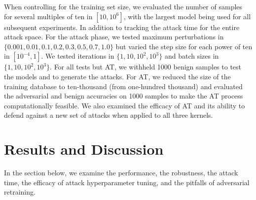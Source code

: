 \documentclass[fonts]{icst}
\begin{document}
When controlling for the training set size, we evaluated the number of samples for several multiples of ten in $[10, 10^6]$, with the largest model being used for all subsequent experiments.
In addition to tracking the attack time for the entire attack space.
For the attack phase, we tested maximum perturbations in $\{0.001, 0.01, 0.1, 0.2, 0.3, 0.5, 0.7, 1.0\}$  but varied the step size for each power of ten in $[10^{-4}, 1]$.
We tested iterations in $\{1, 10, 10^2, 10^3\}$ and batch sizes in $\{1, 10, 10^2, 10^3\}$.
For all tests but AT, we withheld 1000 benign samples to test the models and to generate the attacks.
For AT, we reduced the size of the training database to ten-thousand (from one-hundred thousand) and evaluated the adversarial and benign accuracies on 1000 samples to make the AT process computationally feasible.
We also examined the efficacy of AT and its ability to defend against a new set of attacks when applied to all three kernels.



\section{Results and Discussion}
\label{results}
In the section below, we examine the performance, the robustness, the attack time, the efficacy of attack hyperparameter tuning, and the pitfalls of adversarial retraining.
\end{document}
